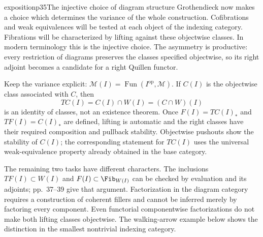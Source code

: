 \begin{dcomment}{exposition}{p35}{The injective choice of diagram structure}
Grothendieck now makes a choice which determines the variance of the whole construction. Cofibrations and weak equivalences will be tested at each object of the indexing category. Fibrations will be characterized by lifting against these objectwise classes. In modern terminology this is the injective choice. The asymmetry is productive: every restriction of diagrams preserves the classes specified objectwise, so its right adjoint becomes a candidate for a right Quillen functor.

Keep the variance explicit: $\mathcal M(I)=\operatorname{Fun}(I^{\mathrm{op}},\mathcal M)$. If $C(I)$ is the objectwise class associated with $C$, then
\[
 TC(I)=C(I)\cap W(I)=(C\cap W)(I)
\]
is an identity of classes, not an existence theorem. Once $F(I)=TC(I)_*$ and $TF(I)=C(I)_*$ are defined, lifting is automatic and the right classes have their required composition and pullback stability. Objectwise pushouts show the stability of $C(I)$; the corresponding statement for $TC(I)$ uses the universal weak-equivalence property already obtained in the base category.

The remaining two tasks have different characters. The inclusions $TF(I)\subset W(I)$ and $F(I)\subset\Fib_{W(I)}$ can be checked by evaluation and its adjoints; pp.~37--39 give that argument. Factorization in the diagram category requires a construction of coherent fillers and cannot be inferred merely by factoring every component. Even functorial componentwise factorizations do not make both lifting classes objectwise. The walking-arrow example below shows the distinction in the smallest nontrivial indexing category.
\end{dcomment}

